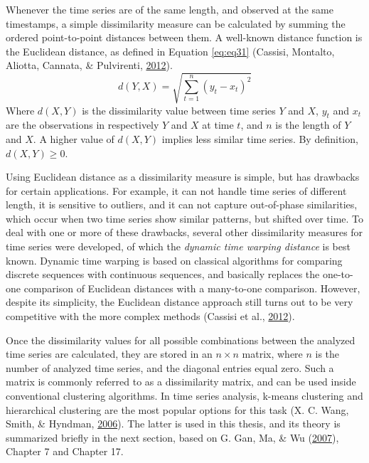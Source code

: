 \documentclass[12pt,oneside]{reedthesis}
\begin{document}
Whenever the time series are of the same length, and observed at the
same timestamps, a simple dissimilarity measure can be calculated by
summing the ordered point-to-point distances between them. A well-known
distance function is the Euclidean distance, as defined in Equation
\eqref{eq:eq31} (Cassisi, Montalto, Aliotta, Cannata, \& Pulvirenti,
\protect\hyperlink{ref-cassisi2012}{2012}).
\begin{equation}
d(Y,X) = \sqrt{\sum_{t=1}^{n}(y_{t}-x_{t})^{2}}
\label{eq:eq31}
\end{equation}
Where \(d(X,Y)\) is the dissimilarity value between time series \(Y\)
and \(X\), \(y_{t}\) and \(x_{t}\) are the observations in respectively
\(Y\) and \(X\) at time \(t\), and \(n\) is the length of \(Y\) and
\(X\). A higher value of \(d(X,Y)\) implies less similar time series. By
definition, \(d(X,Y) \geq 0\).

Using Euclidean distance as a dissimilarity measure is simple, but has
drawbacks for certain applications. For example, it can not handle time
series of different length, it is sensitive to outliers, and it can not
capture out-of-phase similarities, which occur when two time series show
similar patterns, but shifted over time. To deal with one or more of
these drawbacks, several other dissimilarity measures for time series
were developed, of which the \emph{dynamic time warping distance} is
best known. Dynamic time warping is based on classical algorithms for
comparing discrete sequences with continuous sequences, and basically
replaces the one-to-one comparison of Euclidean distances with a
many-to-one comparison. However, despite its simplicity, the Euclidean
distance approach still turns out to be very competitive with the more
complex methods (Cassisi et al.,
\protect\hyperlink{ref-cassisi2012}{2012}).

Once the dissimilarity values for all possible combinations between the
analyzed time series are calculated, they are stored in an
\(n \times n\) matrix, where \(n\) is the number of analyzed time
series, and the diagonal entries equal zero. Such a matrix is commonly
referred to as a dissimilarity matrix, and can be used inside
conventional clustering algorithms. In time series analysis, k-means
clustering and hierarchical clustering are the most popular options for
this task (X. C. Wang, Smith, \& Hyndman,
\protect\hyperlink{ref-wang2006}{2006}). The latter is used in this
thesis, and its theory is summarized briefly in the next section, based
on G. Gan, Ma, \& Wu (\protect\hyperlink{ref-gan2007}{2007}), Chapter 7
and Chapter 17.
\end{document}

